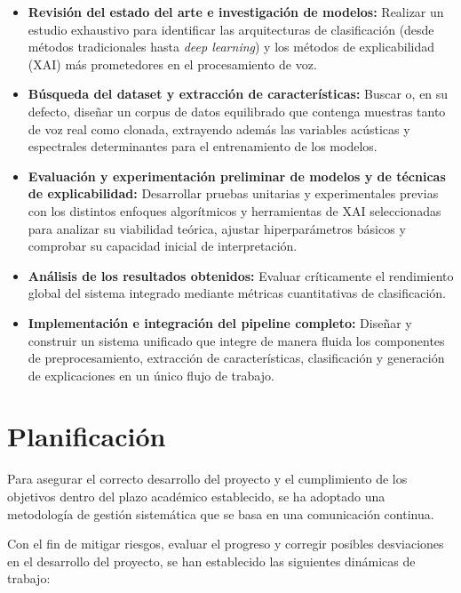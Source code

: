 \begin{itemize}
    \item \textbf{Revisión del estado del arte e investigación de modelos:} Realizar un estudio exhaustivo para identificar las arquitecturas de clasificación (desde métodos tradicionales hasta \textit{deep learning}) y los métodos de explicabilidad (XAI) más prometedores en el procesamiento de voz.
    \item \textbf{Búsqueda del dataset y extracción de características:} Buscar o, en su defecto, diseñar un corpus de datos equilibrado que contenga muestras tanto de voz real como clonada, extrayendo además las variables acústicas y espectrales determinantes para el entrenamiento de los modelos.
    \item \textbf{Evaluación y experimentación preliminar de modelos y de técnicas de explicabilidad:} Desarrollar pruebas unitarias y experimentales previas con los distintos enfoques algorítmicos y herramientas de XAI seleccionadas para analizar su viabilidad teórica, ajustar hiperparámetros básicos y comprobar su capacidad inicial de interpretación.
    	\item \textbf{Análisis de los resultados obtenidos:} Evaluar críticamente el rendimiento global del sistema integrado mediante métricas cuantitativas de clasificación.
    \item \textbf{Implementación e integración del pipeline completo:} Diseñar y construir un sistema unificado que integre de manera fluida los componentes de preprocesamiento, extracción de características, clasificación y generación de explicaciones en un único flujo de trabajo.
\end{itemize}

\section{Planificación}
Para asegurar el correcto desarrollo del proyecto y el cumplimiento de los objetivos dentro del plazo académico establecido, se ha adoptado una metodología de gestión sistemática que se basa en una comunicación continua.

Con el fin de mitigar riesgos, evaluar el progreso y corregir posibles desviaciones en el desarrollo del proyecto, se han establecido las siguientes dinámicas de trabajo:

